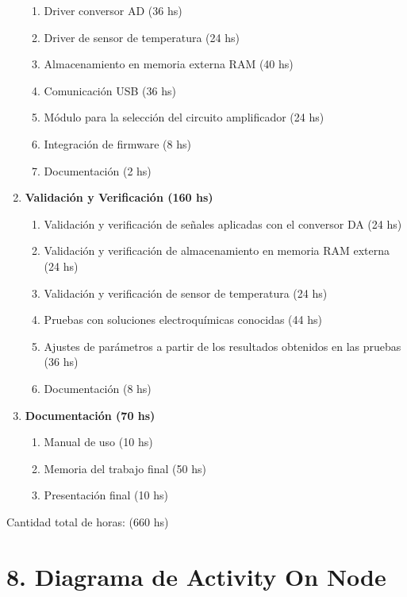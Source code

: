 \documentclass[11pt]{charter}
\begin{document}
\begin{enumerate}
\begin{enumerate}
		\item Driver conversor AD (36 hs)
		\item Driver de sensor de temperatura (24 hs)
		\item Almacenamiento en memoria externa RAM (40 hs)
		\item Comunicación USB (36 hs)
		\item Módulo para la selección del circuito amplificador (24 hs)	
		\item Integración de firmware (8 hs)
		\item Documentación (2 hs)
	\end{enumerate}		
\item \textbf{Validación y Verificación (160 hs)}
	\begin{enumerate}
		\item Validación y verificación de señales aplicadas con el conversor DA (24 hs)
		\item Validación y verificación de almacenamiento en memoria RAM externa (24 hs)
		\item Validación y verificación de sensor de temperatura (24 hs)
		\item Pruebas con soluciones electroquímicas conocidas (44 hs)
		\item Ajustes de parámetros a partir de los resultados obtenidos en las pruebas (36 hs)
		\item Documentación (8 hs)
	\end{enumerate}
\item \textbf{Documentación (70 hs)}
	\begin{enumerate}
		\item Manual de uso (10 hs)
		\item Memoria del trabajo final (50 hs)
		\item Presentación final (10 hs)
	\end{enumerate}
\end{enumerate}

Cantidad total de horas: (660 hs)


\section{8. Diagrama de Activity On Node}
\label{sec:AoN}
\end{document}
